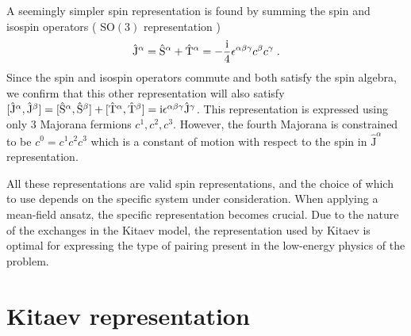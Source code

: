 A seemingly simpler spin representation is found by summing the spin and isospin operators ( $\mathrm{SO}(3)$ representation \cite{Fu2018})
\begin{equation}
    \hat{\mathrm{J}}^\alpha = \hat{\mathrm{S}}^\alpha + \hat{\mathrm{T}}^\alpha = -\frac{\mathrm{i}}{4} \epsilon^{\alpha\beta\gamma} c^\beta c^\gamma
    \; .
\end{equation}
Since the spin and isospin operators commute and both satisfy the spin algebra, we confirm that this other representation will also satisfy $[ \hat{\mathrm{J}}^\alpha, \hat{\mathrm{J}}^\beta]=[ \hat{\mathrm{S}}^\alpha, \hat{\mathrm{S}}^\beta]+[ \hat{\mathrm{T}}^\alpha, \hat{\mathrm{T}}^\beta]= \mathrm{i} \epsilon^{\alpha\beta\gamma} \hat{\mathrm{J}}^\gamma $.
This representation is expressed using only $3$ Majorana fermions $c^1,c^2,c^3$. However,  the fourth Majorana is constrained to be $c^0=c^1 c^2 c^3$ which is a constant of motion with respect to the spin in $\hat{\mathrm{J}}^\alpha$ representation.


All these representations are valid spin representations, and the choice of which to use depends on the specific system under consideration. When applying a mean-field ansatz, the specific representation becomes crucial. Due to the nature of the exchanges in the Kitaev model, the representation used by Kitaev is optimal for expressing the type of pairing present in the low-energy physics of the problem.

\section{Kitaev representation }

